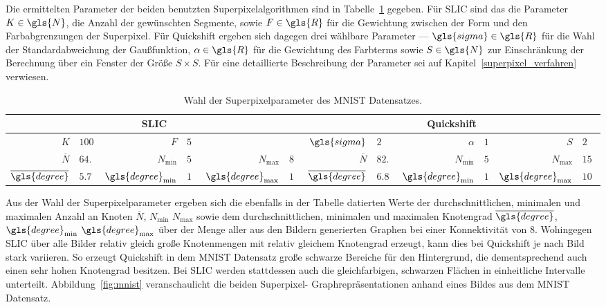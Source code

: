Die ermittelten Parameter \bzgl{} der beiden benutzten Superpixelalgorithmen sind in Tabelle~\ref{tab:mnist} gegeben.
Für \gls{SLIC} sind das die Parameter $K \in \gls{N}$, \dhe{} die Anzahl der gewünschten Segmente, sowie $F \in \gls{R}$ für die Gewichtung zwischen der Form und den Farbabgrenzungen der Superpixel.
Für Quickshift ergeben sich dagegen drei wählbare Parameter — $\gls{sigma} \in \gls{R}$ für die Wahl der Standardabweichung der Gaußfunktion, $\alpha \in \gls{R}$ für die Gewichtung des Farbterms sowie $S \in \gls{N}$ zur Einschränkung der Berechnung über ein Fenster der Größe $S \times S$.
Für eine detaillierte Beschreibung der Parameter sei auf Kapitel~\ref{superpixel_verfahren} verwiesen.
\begin{table}[t]
\centering
\begin{tabular}{rlrlrlrlrlrl}
  \toprule
  \multicolumn{6}{c}{\gls{SLIC}} & \multicolumn{6}{c}{Quickshift}\\
  \midrule
  $K$ & $100$ & $F$ & $5$ & & & $\gls{sigma}$ & $2$ & $\alpha$ & $1$ & $S$ & $2$\\
  \midrule
  $\overline{N}$ & $64.6$ & $N_{\min}$ & $50$ & $N_{\max}$ & $80$ & $\overline{N}$ & $82.1$ & $N_{\min}$ & $5$ & $N_{\max}$ & $154$\\
  $\overline{\gls{degree}}$ & $5.7$ & $\gls{degree}_{\min}$ & $1$ & $\gls{degree}_{\max}$ & $19$ & $\overline{\gls{degree}}$ & $6.8$ & $\gls{degree}_{\min}$ & $1$ & $\gls{degree}_{\max}$ & $101$\\
  \bottomrule
\end{tabular}
\caption[\gls{MNIST} Superpixelparameter]{Wahl der Superpixelparameter des \gls{MNIST} Datensatzes.}
\label{tab:mnist}
\end{table}

Aus der Wahl der Superpixelparameter ergeben sich die ebenfalls in der Tabelle datierten Werte der durchschnittlichen, minimalen und maximalen Anzahl an Knoten $\overline{N}$, $N_{\min}$ \bzw{} $N_{\max}$ sowie dem durchschnittlichen, minimalen und maximalen Knotengrad $\overline{\gls{degree}}$, $\gls{degree}_{\min}$ \bzw{} $\gls{degree}_{\max}$ über der Menge aller aus den Bildern generierten Graphen bei einer Konnektivität von $8$.
Wohingegen \gls{SLIC} über alle Bilder relativ gleich große Knotenmengen mit relativ gleichem Knotengrad erzeugt, kann dies bei Quickshift je nach Bild stark variieren.
So erzeugt Quickshift in dem \gls{MNIST} Datensatz \bspw{} große schwarze Bereiche für den Hintergrund, die dementsprechend auch einen sehr hohen Knotengrad besitzen.
Bei \gls{SLIC} werden stattdessen auch die gleichfarbigen, schwarzen Flächen in einheitliche Intervalle unterteilt.
Abbildung~\ref{fig:mnist} veranschaulicht die beiden Superpixel- \bzw{} Graphrepräsentationen anhand eines Bildes aus dem \gls{MNIST} Datensatz.


